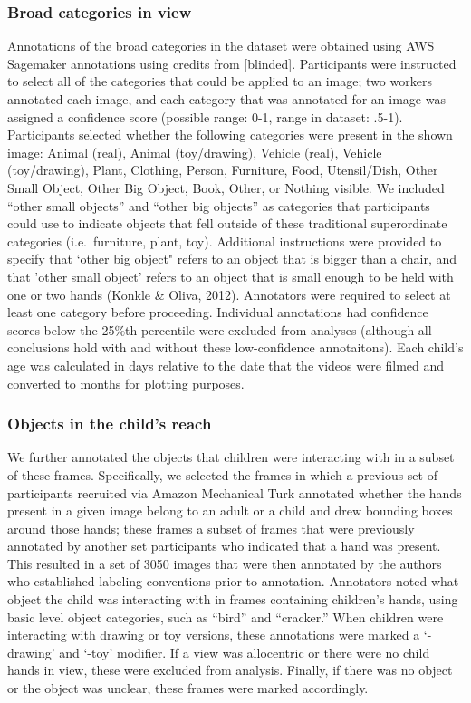 \documentclass[10pt, letterpaper]{article}
\begin{document}
\hypertarget{broad-categories-in-view}{%
\subsubsection{Broad categories in
view}\label{broad-categories-in-view}}

Annotations of the broad categories in the dataset were obtained using
AWS Sagemaker annotations using credits from {[}blinded{]}. Participants
were instructed to select all of the categories that could be applied to
an image; two workers annotated each image, and each category that was
annotated for an image was assigned a confidence score (possible range:
0-1, range in dataset: .5-1). Participants selected whether the
following categories were present in the shown image: Animal (real),
Animal (toy/drawing), Vehicle (real), Vehicle (toy/drawing), Plant,
Clothing, Person, Furniture, Food, Utensil/Dish, Other Small Object,
Other Big Object, Book, Other, or Nothing visible. We included ``other
small objects'' and ``other big objects'' as categories that
participants could use to indicate objects that fell outside of these
traditional superordinate categories (i.e.~furniture, plant, toy).
Additional instructions were provided to specify that `other big object"
refers to an object that is bigger than a chair, and that 'other small
object' refers to an object that is small enough to be held with one or
two hands (Konkle \& Oliva, 2012). Annotators were required to select at
least one category before proceeding. Individual annotations had
confidence scores below the 25\%th percentile were excluded from
analyses (although all conclusions hold with and without these
low-confidence annotaitons). Each child's age was calculated in days
relative to the date that the videos were filmed and converted to months
for plotting purposes.

\hypertarget{objects-in-the-childs-reach}{%
\subsubsection{Objects in the child's
reach}\label{objects-in-the-childs-reach}}

We further annotated the objects that children were interacting with in
a subset of these frames. Specifically, we selected the frames in which
a previous set of participants recruited via Amazon Mechanical Turk
annotated whether the hands present in a given image belong to an adult
or a child and drew bounding boxes around those hands; these frames a
subset of frames that were previously annotated by another set
participants who indicated that a hand was present. This resulted in a
set of 3050 images that were then annotated by the authors who
established labeling conventions prior to annotation. Annotators noted
what object the child was interacting with in frames containing
children's hands, using basic level object categories, such as ``bird''
and ``cracker.'' When children were interacting with drawing or toy
versions, these annotations were marked a `-drawing' and `-toy'
modifier. If a view was allocentric or there were no child hands in
view, these were excluded from analysis. Finally, if there was no object
or the object was unclear, these frames were marked accordingly.
\end{document}
